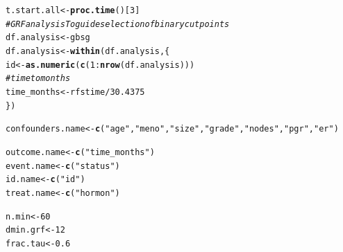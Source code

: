 \documentclass[9pt]{article}\usepackage[]{graphicx}\usepackage[]{xcolor}
\makeatletter
\newcommand{\hlnum}[1]{\textcolor[rgb]{0.686,0.059,0.569}{#1}}%
\newcommand{\hlstr}[1]{\textcolor[rgb]{0.192,0.494,0.8}{#1}}%
\newcommand{\hlcom}[1]{\textcolor[rgb]{0.678,0.584,0.686}{\textit{#1}}}%
\newcommand{\hlopt}[1]{\textcolor[rgb]{0,0,0}{#1}}%
\newcommand{\hlstd}[1]{\textcolor[rgb]{0.345,0.345,0.345}{#1}}%
\newcommand{\hlkwb}[1]{\textcolor[rgb]{0.69,0.353,0.396}{#1}}%
\newcommand{\hlkwd}[1]{\textcolor[rgb]{0.737,0.353,0.396}{\textbf{#1}}}%
\newenvironment{kframe}{%
 \def\at@end@of@kframe{}%
 \ifinner\ifhmode%
  \def\at@end@of@kframe{\end{minipage}}%
  \begin{minipage}{\columnwidth}%
 \fi\fi%
 \def\FrameCommand##1{\hskip\@totalleftmargin \hskip-\fboxsep
 \colorbox{shadecolor}{##1}\hskip-\fboxsep
     \hskip-\linewidth \hskip-\@totalleftmargin \hskip\columnwidth}%
 \MakeFramed {\advance\hsize-\width
   \@totalleftmargin\z@ \linewidth\hsize
   \@setminipage}}%
 {\par\unskip\endMakeFramed%
 \at@end@of@kframe}
\newenvironment{knitrout}{}{} %
\theoremstyle{definition}
\theoremstyle{remark}
\makeatother
\begin{document}
\begin{knitrout}
\color{fgcolor}\begin{kframe}
\begin{alltt}
\hlstd{t.start.all} \hlkwb{<-} \hlkwd{proc.time}\hlstd{()[}\hlnum{3}\hlstd{]}
\hlcom{# GRF analysis To guide selection of binary cutpoints}
\hlstd{df.analysis} \hlkwb{<-} \hlstd{gbsg}
\hlstd{df.analysis} \hlkwb{<-} \hlkwd{within}\hlstd{(df.analysis, \{}
    \hlstd{id} \hlkwb{<-} \hlkwd{as.numeric}\hlstd{(}\hlkwd{c}\hlstd{(}\hlnum{1}\hlopt{:}\hlkwd{nrow}\hlstd{(df.analysis)))}
    \hlcom{# time to months}
    \hlstd{time_months} \hlkwb{<-} \hlstd{rfstime}\hlopt{/}\hlnum{30.4375}
\hlstd{\})}

\hlstd{confounders.name} \hlkwb{<-} \hlkwd{c}\hlstd{(}\hlstr{"age"}\hlstd{,} \hlstr{"meno"}\hlstd{,} \hlstr{"size"}\hlstd{,} \hlstr{"grade"}\hlstd{,} \hlstr{"nodes"}\hlstd{,} \hlstr{"pgr"}\hlstd{,} \hlstr{"er"}\hlstd{)}

\hlstd{outcome.name} \hlkwb{<-} \hlkwd{c}\hlstd{(}\hlstr{"time_months"}\hlstd{)}
\hlstd{event.name} \hlkwb{<-} \hlkwd{c}\hlstd{(}\hlstr{"status"}\hlstd{)}
\hlstd{id.name} \hlkwb{<-} \hlkwd{c}\hlstd{(}\hlstr{"id"}\hlstd{)}
\hlstd{treat.name} \hlkwb{<-} \hlkwd{c}\hlstd{(}\hlstr{"hormon"}\hlstd{)}

\hlstd{n.min} \hlkwb{<-} \hlnum{60}
\hlstd{dmin.grf} \hlkwb{<-} \hlnum{12}
\hlstd{frac.tau} \hlkwb{<-} \hlnum{0.6}


\end{alltt}
\end{kframe}
\end{knitrout}
\end{document}
